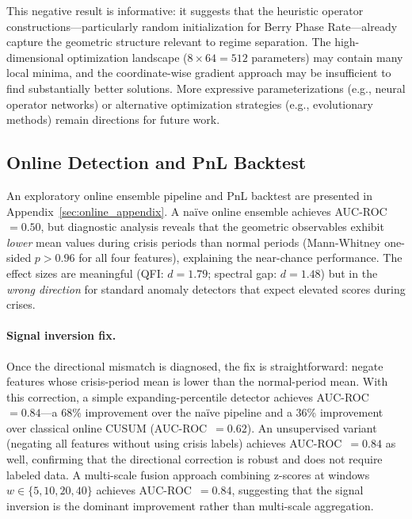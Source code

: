 This negative result is informative: it suggests that the heuristic
operator constructions---particularly random initialization for Berry
Phase Rate---already capture the geometric structure relevant to regime
separation.  The high-dimensional optimization landscape ($8 \times
64 = 512$ parameters) may contain many local minima, and the
coordinate-wise gradient approach may be insufficient to find
substantially better solutions.  More expressive parameterizations
(e.g., neural operator networks) or alternative optimization strategies
(e.g., evolutionary methods) remain directions for future work.



\subsection{Online Detection and PnL Backtest}\label{subsec:online_backtest}

An exploratory online ensemble pipeline and PnL backtest are presented
in Appendix~\ref{sec:online_appendix}.  A na\"ive online ensemble
achieves AUC-ROC~$= 0.50$, but diagnostic analysis reveals that the
geometric observables exhibit \emph{lower} mean values during crisis
periods than normal periods (Mann-Whitney one-sided $p > 0.96$ for all
four features), explaining the near-chance performance.  The effect
sizes are meaningful (QFI: $d = 1.79$; spectral gap: $d = 1.48$)
but in the \emph{wrong direction} for standard anomaly detectors that
expect elevated scores during crises.

\paragraph{Signal inversion fix.}
Once the directional mismatch is diagnosed, the fix is straightforward:
negate features whose crisis-period mean is lower than the normal-period
mean.  With this correction, a simple expanding-percentile detector
achieves AUC-ROC~$= 0.84$---a 68\% improvement over the na\"ive
pipeline and a 36\% improvement over classical online CUSUM
(AUC-ROC~$= 0.62$).  An unsupervised variant (negating all features
without using crisis labels) achieves AUC-ROC~$= 0.84$ as well,
confirming that the directional correction is robust and does not
require labeled data.  A multi-scale fusion approach combining z-scores
at windows $w \in \{5, 10, 20, 40\}$ achieves AUC-ROC~$= 0.84$,
suggesting that the signal inversion is the dominant improvement
rather than multi-scale aggregation.

